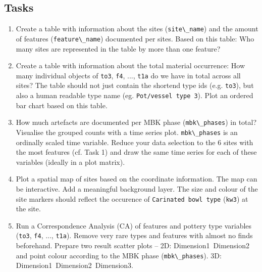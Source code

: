 \documentclass[8pt]{beamer}
\begin{document}
\begin{frame}
\section{Tasks}


\begin{small}

\begin{enumerate}

\item Create a table with information about the sites (\verb|site\_name|) and the amount of features (\verb|feature\_name|) documented per sites. Based on this table: Who many sites are represented in the table by more than one feature? 

\item Create a table with information about the total material occurrence: How many individual objects of \verb|to3|, \verb|f4|, ..., \verb|t1a| do we have in total across all sites? The table should not just contain the shortend type ids (e.g. \verb|to3|), but also a human readable type name (eg. \verb|Pot/vessel type 3|). Plot an ordered bar chart based on this table.

\item How much artefacts are documented per MBK phase (\verb|mbk\_phases|) in total? Visualise the grouped counts with a time series plot. \verb|mbk\_phases| is an ordinally scaled time variable. Reduce your data selection to the 6 sites with the most features (cf. Task 1) and draw the same time series for each of these variables (ideally in a plot matrix).

\item Plot a spatial map of sites based on the coordinate information. The map can be interactive. Add a meaningful background layer. The size and colour of the site markers should reflect the occurence of \verb|Carinated bowl type| (\verb|kw3|) at the site.

\item Run a Correspondence Analysis (CA) of features and pottery type variables (\verb|to3|, \verb|f4|, ..., \verb|t1a|). Remove very rare types and features with almost no finds beforehand. Prepare two result scatter plots -- 2D: Dimension1~Dimension2 and point colour according to the MBK phase (\verb|mbk\_phases|). 3D: Dimension1~Dimension2~Dimension3.


\end{enumerate}
\end{small}
\end{frame}
\end{document}
